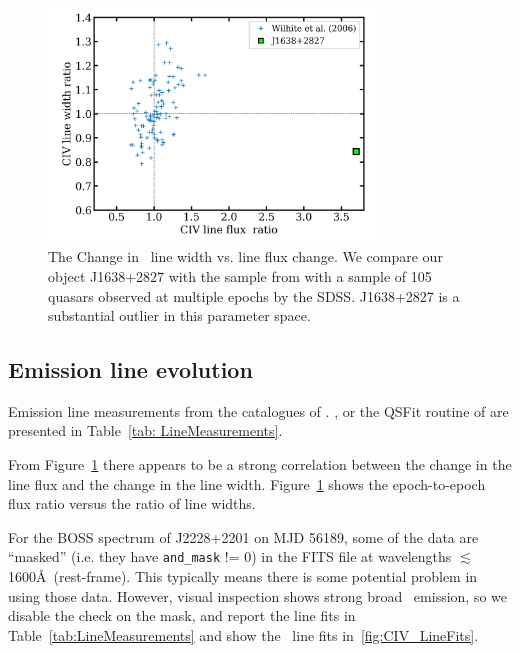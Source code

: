 \documentclass[a4paper,fleqn,usenatbib]{mnras}
\begin{document}
\begin{figure}
  \centering
  \includegraphics[width=8.7cm, trim=0.2cm 0.2cm 0.2cm 0.2cm, clip]
  {figures/Wilhite_2006_Fig2_redux_20190926.png}
   \vspace{-12pt}
  \caption[]{The Change in \civ\ line width vs. line flux change. 
We compare our object J1638+2827 with the sample 
from \citet{Wilhite2006} with a sample of 105 quasars observed at
multiple epochs by the SDSS. J1638+2827 is a substantial outlier 
in this parameter space.}
  \label{fig:Wilhite2006_comparison}
\end{figure}
\subsection{Emission line evolution}
Emission line measurements from the catalogues of \citet{Shen2011}.
\citet{Hamann2017}, \citet{Kozlowski2017} or the QSFit routine of
\citet{Calderone2017} are presented in Table~\ref{tab:
LineMeasurements}.

From Figure~\ref{fig:Wilhite2006_comparison} there appears to be a
strong correlation between the change in the line flux and the change
in the line width.  Figure~\ref{fig:Wilhite2006_comparison} shows the
epoch-to-epoch flux ratio versus the ratio of line widths.

For the BOSS spectrum of J2228+2201 on MJD 56189, some of the data are
``masked'' (i.e. they have {\tt and\_mask} != 0) in the FITS file at
wavelengths $\lesssim$1600\AA\ (rest-frame).  This typically means
there is some potential problem in using those data. However, visual
inspection shows strong broad \civ\ emission, so we disable the check on the mask,
and report the line fits in Table~\ref{tab:LineMeasurements} and show the \civ\ line 
fits in~\ref{fig:CIV_LineFits}.
\end{document}
